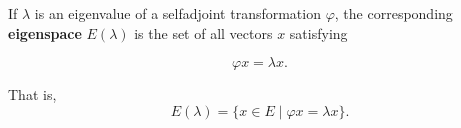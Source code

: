 If $\lambda$ is an eigenvalue of a selfadjoint transformation $\varphi$, the corresponding \textbf{eigenspace} $E(\lambda)$ is the set of all vectors $x$ satisfying

$$\varphi x = \lambda x.$$

That is,
$$E(\lambda) = \{ x \in E \mid \varphi x = \lambda x \}.$$
